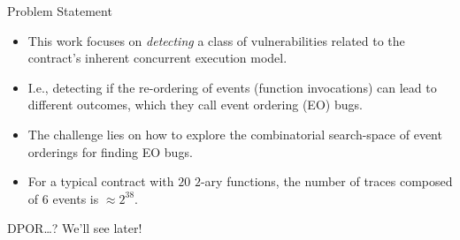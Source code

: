 \documentclass[9pt]{beamer}
\begin{document}
\begin{frame}{Problem Statement}
  \begin{itemize}
  \item This work focuses on \emph{detecting} a class of
    vulnerabilities related to the contract's inherent
    \alert{concurrent} execution model.
  \pause\item I.e., detecting if the re-ordering of events (function
    invocations) can lead to different outcomes, which they call
    \alert{event ordering} (EO) bugs.
  \pause\item The challenge lies on how to explore the
    \alert{combinatorial} search-space of event orderings
    for finding EO bugs.
  \pause\item For a typical contract with $20$ $2$-ary functions,
  the number of traces composed of $6$ events is $\approx 2^{38}$.
  \end{itemize}
  \pause\vspace{1cm}
  \begin{center}
    \alert{DPOR}\ldots?  We'll see later!
  \end{center}
\end{frame}
%
\end{document}
